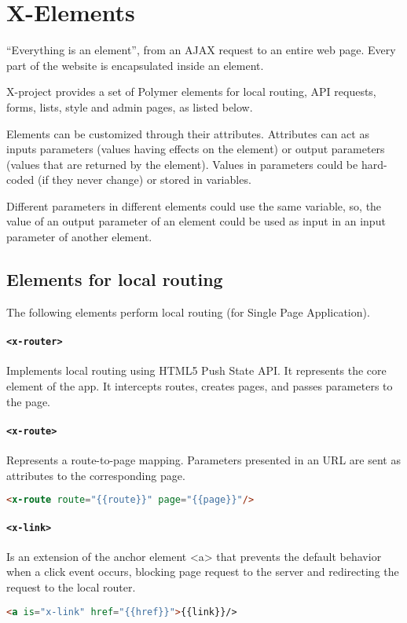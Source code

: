 \section{X-Elements}
\label{sec:XPR_xel}

``Everything is an element'', from an AJAX request to an entire web page. Every part of the website is encapsulated inside an element.

X-project provides a set of Polymer elements for local routing, API requests, forms, lists, style and admin pages, as listed below.

Elements can be customized through their attributes. Attributes can act as inputs parameters (values having effects on the element) or output parameters (values that are returned by the element). Values in parameters could be hard-coded (if they never change) or stored in variables.

Different parameters in different elements could use the same variable, so, the value of an output parameter of an element could be used as input in an input parameter of another element.

\subsection{Elements for local routing}

The following elements perform local routing (for Single Page Application).
\paragraph{\texttt{<x-router>}} Implements local routing using HTML5 Push State API. It represents the core element of the app. It intercepts routes, creates pages, and passes parameters to the page.
\paragraph{\texttt{<x-route>}} Represents a route-to-page mapping. Parameters presented in an URL are sent as attributes to the corresponding page.
\begin{lstlisting}[language=html]
<x-route route="{{route}}" page="{{page}}"/>
\end{lstlisting}
\paragraph{\texttt{<x-link>}} Is an extension of the anchor element <a> that prevents the default behavior when a click event occurs, blocking page request to the server and redirecting the request to the local router.
\begin{lstlisting}[language=html]
<a is="x-link" href="{{href}}">{{link}}/>
\end{lstlisting}

